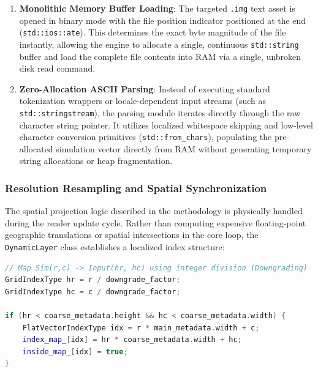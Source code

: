 \begin{enumerate}
    \item \textbf{Monolithic Memory Buffer Loading}: The targeted \texttt{.img} text asset is opened in binary mode with the file position 
    indicator positioned at the end \\ (\texttt{std::ios::ate}). This determines the exact byte magnitude of the file instantly, allowing the 
    engine to allocate a single, continuous \texttt{std::string} buffer and load the complete file contents into RAM via a single, unbroken 
    disk read command.
    
    \item \textbf{Zero-Allocation ASCII Parsing}: Instead of executing standard tokenization wrappers or locale-dependent input streams 
    (such as \texttt{std::stringstream}), the parsing module iterates directly through the raw character string pointer. It utilizes 
    localized whitespace skipping and low-level character conversion primitives (\texttt{std::from\_chars}), populating the pre-allocated 
    simulation vector directly from RAM without generating temporary string allocations or heap fragmentation.
\end{enumerate}

\subsubsection{Resolution Resampling and Spatial Synchronization}
\label{subsub:resolution_resampling}

The spatial projection logic described in the methodology is physically handled during the reader update cycle. Rather than computing 
expensive floating-point geographic translations or spatial intersections in the core loop, the \texttt{DynamicLayer} class establishes a 
localized index structure:

\begin{lstlisting}[language=C++, caption={Resolution resampling and spatial downscaling lookups inside the layer initialization.}]
// Map Sim(r,c) -> Input(hr, hc) using integer division (Downgrading)
GridIndexType hr = r / downgrade_factor;
GridIndexType hc = c / downgrade_factor;

if (hr < coarse_metadata.height && hc < coarse_metadata.width) {
    FlatVectorIndexType idx = r * main_metadata.width + c;
    index_map_[idx] = hr * coarse_metadata.width + hc;
    inside_map_[idx] = true;
}
\end{lstlisting}

